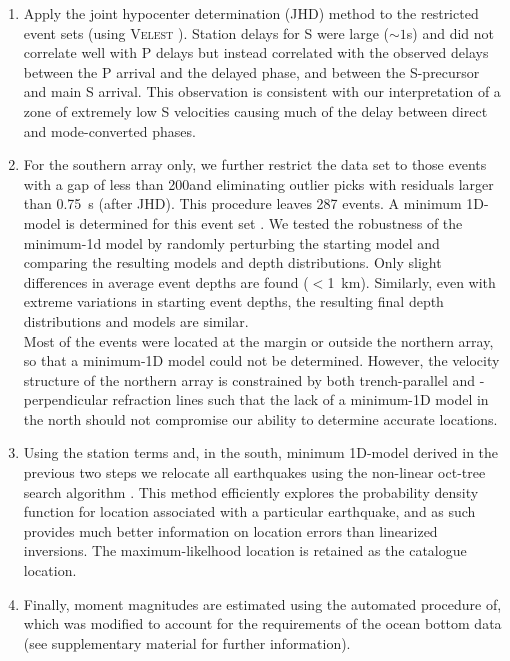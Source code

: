 \documentclass[reviewcopy]{elsart}
\begin{document}
\begin{enumerate}
\item Apply the joint
  hypocenter determination (JHD) method to the restricted event sets (using
  \textsc{Velest} \citep{kissling94}).  Station delays for S were large ($\sim 1$s) and did
  not correlate well with P delays but instead correlated with
  the observed delays between the P arrival and the delayed phase, and
between the S-precursor and main S arrival.  This observation is consistent
  with our interpretation of a zone of extremely low S velocities
  causing much of the delay between direct and mode-converted phases. 
\item For the southern array only, we further restrict the data set to
  those events with a gap of less than 200\dg and eliminating outlier
  picks 
  with residuals larger than 0.75~s (after JHD).
% 
  This procedure leaves 287 events. A minimum 1D-model is determined
  for this event set \citep{kissling94}.  We tested the robustness of the minimum-1d
  model by randomly perturbing the starting model and comparing the resulting models and depth distributions.
  Only slight differences in average event depths are found
  ($<$1~km). Similarly, even with extreme variations in starting event
  depths,
 the resulting final depth distributions and models are
  similar. \\
  Most of the events were located at the margin or outside the
  northern array, so that a minimum-1D model could not be determined.
  However, the velocity structure of the northern array is
  constrained by both trench-parallel and -perpendicular refraction
  lines \citep{scherwath06}
such
  that the lack of a minimum-1D model in the north should not
  compromise our ability to determine accurate
  locations. 
\item Using the station terms and, in the south, minimum 1D-model
  derived in the previous two steps we relocate all earthquakes using
  the non-linear oct-tree search algorithm \citep{lomax00}.  This method efficiently
  explores the probability density function for location associated
  with a particular earthquake, and as such provides much better
  information on location errors than linearized inversions.  The
  maximum-likelhood location is retained as the catalogue location. 
\item 
Finally, moment magnitudes are estimated using the automated procedure
of\citet{ottemoeller03}, which was modified to account for the
requirements of the ocean bottom data (see supplementary material for
further information).  
\end{enumerate}
\end{document}
